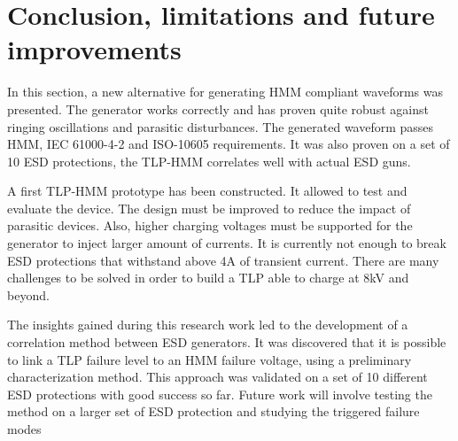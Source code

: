 \section{Conclusion, limitations and future improvements}

In this section, a new alternative for generating HMM compliant waveforms was presented.
The generator works correctly and has proven quite robust against ringing oscillations and parasitic disturbances.
The generated waveform passes HMM, IEC 61000-4-2 and ISO-10605 requirements.
It was also proven on a set of 10 ESD protections, the TLP-HMM correlates well with actual ESD guns.

A first TLP-HMM prototype has been constructed.
It allowed to test and evaluate the device.
The design must be improved to reduce the impact of parasitic devices.
Also, higher charging voltages must be supported for the generator to inject larger amount of currents.
It is currently not enough to break ESD protections that withstand above 4A of transient current.
There are many challenges to be solved in order to build a TLP able to charge at 8kV and beyond.

The insights gained during this research work led to the development of a correlation method between ESD generators.
It was discovered that it is possible to link a TLP failure level to an HMM failure voltage, using a preliminary characterization method.
This approach was validated on a set of 10 different ESD protections with good success so far.
Future work will involve testing the method on a larger set of ESD protection and studying the triggered failure modes
